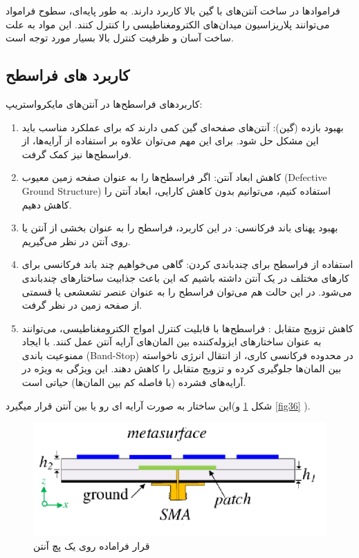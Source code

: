 فراموادها در ساخت آنتن‌های با گین بالا کاربرد دارند. به طور پایه‌ای، سطوح فرامواد
 می‌توانند پلاریزاسیون میدان‌های الکترومغناطیسی را کنترل کنند.
این مواد به علت ساخت آسان و ظرفیت کنترل بالا بسیار مورد توجه است.

\subsection{کاربرد های فراسطح}
 کاربردهای فراسطح‌ها در آنتن‌های مایکرواستریپ:
\begin{enumerate}
	\item{
	بهبود بازده (گین): آنتن‌های صفحه‌ای گین کمی دارند که برای عملکرد مناسب باید این مشکل حل شود. برای این مهم می‌توان علاوه بر استفاده از آرایه‌ها، از فراسطح‌ها نیز کمک گرفت.
	}
	\item{
	کاهش ابعاد آنتن: اگر فراسطح‌ها را به عنوان صفحه زمین معیوب (Defective Ground Structure) استفاده کنیم، می‌توانیم بدون کاهش کارایی، ابعاد آنتن را کاهش دهیم.
	}
	\item{
	بهبود پهنای باند فرکانسی: در این کاربرد، فراسطح را به عنوان بخشی از آنتن یا روی آنتن در نظر می‌گیریم.
	}
	\item{
	استفاده از فراسطح برای چندباندی کردن: گاهی می‌خواهیم چند باند فرکانسی برای کارهای مختلف در یک آنتن داشته باشیم که این باعث جذابیت ساختارهای چندباندی می‌شود. در این حالت هم می‌توان فراسطح را به عنوان عنصر تشعشعی یا قسمتی از صفحه زمین در نظر گرفت.
	}
	\item{
	کاهش تزویج متقابل : فراسطح‌ها با قابلیت کنترل امواج الکترومغناطیسی، می‌توانند به عنوان ساختارهای ایزوله‌کننده بین المان‌های آرایه آنتن عمل کنند. با ایجاد ممنوعیت باندی (Band-Stop) در محدوده فرکانسی کاری، از انتقال انرژی ناخواسته بین المان‌ها جلوگیری کرده و تزویج متقابل را کاهش دهند. این ویژگی به ویژه در آرایه‌های فشرده (با فاصله کم بین المان‌ها) حیاتی است.
	}
\end{enumerate}

این ساختار به صورت آرایه ای رو یا بین آنتن قرار میگیرد(شکل
\ref{fig35}
و
\ref{fig36}
).

\begin{figure}
	\centering
	\includegraphics[scale=0.5]{Images/fig35.png}
	\caption{قرار فراماده روی یک پچ آنتن}
	\label{fig35}
\end{figure}

